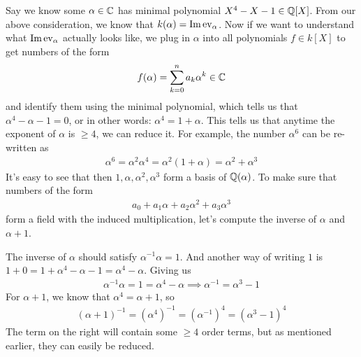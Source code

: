 \begin{ex}[]

Say we know some $\alpha \in \mathbb{C}$ has minimal polynomial $X^{4} - X - 1 \in \mathbb{Q}[X]$.
From our above consideration, we know that $k(\alpha) = \operatorname{Im} \operatorname{ev}_{\alpha}$.
Now if we want to understand what $\operatorname{Im} \operatorname{ev}_{\alpha}$ actually looks like, we plug in $\alpha$ into all polynomials $f \in k[X]$ to get numbers of the form
\begin{align*}
  f(\alpha) = \sum_{k=0}^{n} a_k\alpha^{k} \in \mathbb{C}
\end{align*}
and identify them using the minimal polynomial, which tells us that $\alpha^{4} - \alpha - 1 = 0$, or in other words: $\alpha^{4} = 1 + \alpha$.
This tells us that anytime the exponent of $\alpha$ is $\geq 4$, we can reduce it. 
For example, the number $\alpha^{6}$ can be re-written as
\begin{align*}
  \alpha^{6} = \alpha^{2} \alpha^{4} = \alpha^{2} (1 + \alpha) = \alpha^{2} + \alpha^{3}
\end{align*}
It's easy to see that then $1,\alpha,\alpha^{2},\alpha^{3}$ form a basis of $\mathbb{Q}(\alpha)$.
To make sure that numbers of the form
\begin{align*}
  a_0 + a_1 \alpha + a_2 \alpha^{2} + a_3 \alpha^{3}
\end{align*}
form a field with the induced multiplication, let's compute the inverse of $\alpha$ and $\alpha+1$.

The inverse of $\alpha$ should satisfy $\alpha^{-1} \alpha = 1$.
And another way of writing $1$ is $1 + 0 = 1 + \alpha^{4} - \alpha - 1 = \alpha^{4} - \alpha$. Giving us
\begin{align*}
  \alpha^{-1} \alpha = 1 = \alpha^{4} - \alpha \implies \alpha^{-1} = \alpha^{3} - 1
\end{align*}
For $\alpha + 1$, we know that $\alpha^{4} = \alpha + 1$, so
\begin{align*}
  (\alpha +1)^{-1} = (\alpha^{4})^{-1} = (\alpha^{-1})^{4} = (\alpha^{3} - 1)^{4}
\end{align*}
The term on the right will contain some $\geq 4$ order terms, but as mentioned earlier, they can easily be reduced.
\end{ex}




